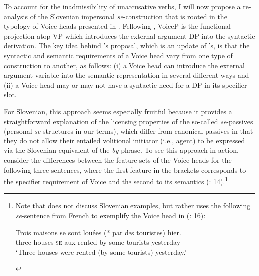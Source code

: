 \documentclass[output=paper,
modfonts,nonflat,
newtxmath
]{langsci/langscibook}
\begin{document}
To account for the inadmissibility of unaccusative verbs, I will now propose a re-analysis of the Slovenian impersonal \textit{se}-construction that is rooted in the typology of Voice heads presented in \citet{schaffer2017}. Following \citet{kratzer1996}, VoiceP is the functional projection atop VP which introduces the external argument DP into the syntactic derivation. The key idea behind \citeauthor{schaffer2017}’s proposal, which is an update of \citeauthor{kratzer1996}’s, is that the syntactic and semantic requirements of a Voice head vary from one type of construction to another, as follows: (i) a Voice head can introduce the external argument variable into the semantic representation in several different ways and (ii) a Voice head may or may not have a syntactic need for a DP in its specifier slot. \par
For Slovenian, this approach seems especially fruitful because it provides a straightforward explanation of the licensing properties of the so-called \textit{se}-passives (personal \textit{se}-structures in our terms), which differ from canonical passives in that they do not allow their entailed volitional initiator (i.e., agent) to be expressed via the Slovenian equivalent of the \textit{by}-phrase. To see this approach in action, consider the differences between the feature sets of the Voice heads for the following three sentences, where the first feature in the brackets corresponds to the specifier requirement of Voice and the second to its semantics (\citealt{schaffer2017}: 14).\footnote{Note that \citet{schaffer2017} does not discuss Slovenian examples, but rather uses the following \textit{se}-sentence from French to exemplify  the Voice head in  (\citealt{schaffer2017}: 16):
\begin{exe}
\ex \gll Trois maisons se sont louées (*\hspace{-2pt} par des touristes) hier.\\
three houses \textsc{se} aux rented {} by some tourists yesterday\\
\trans `Three houses were rented (by some tourists) yesterday.'
\end{exe}}
\end{document}
